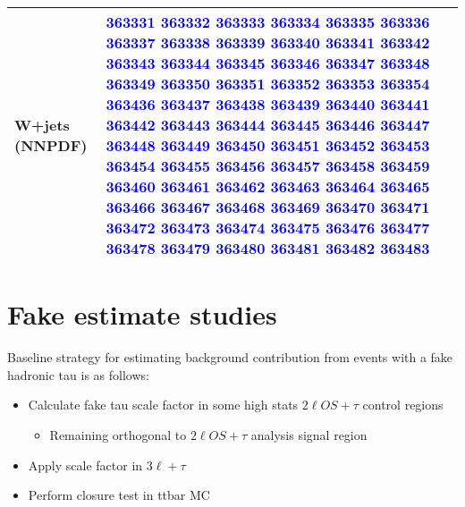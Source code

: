 \documentclass[11pt]{article}
\begin{document}
{\begin{tabular}{|l|p{10cm}|}
			W+jets (NNPDF) & \textcolor{blue}{363331} \textcolor{blue}{363332} \textcolor{blue}{363333} \textcolor{blue}{363334} \textcolor{blue}{363335} \textcolor{blue}{363336} \textcolor{blue}{363337} \textcolor{blue}{363338} \textcolor{blue}{363339} \textcolor{blue}{363340} \textcolor{blue}{363341} \textcolor{blue}{363342} \textcolor{blue}{363343} \textcolor{blue}{363344} \textcolor{blue}{363345} \textcolor{blue}{363346} \textcolor{blue}{363347} \textcolor{blue}{363348} \textcolor{blue}{363349} \textcolor{blue}{363350} \textcolor{blue}{363351} \textcolor{blue}{363352} \textcolor{blue}{363353} \textcolor{blue}{363354} \textcolor{blue}{363436} \textcolor{blue}{363437} \textcolor{blue}{363438} \textcolor{blue}{363439} \textcolor{blue}{363440} \textcolor{blue}{363441} \textcolor{blue}{363442} \textcolor{blue}{363443} \textcolor{blue}{363444} \textcolor{blue}{363445} \textcolor{blue}{363446} \textcolor{blue}{363447} \textcolor{blue}{363448} \textcolor{blue}{363449} \textcolor{blue}{363450} \textcolor{blue}{363451} \textcolor{blue}{363452} \textcolor{blue}{363453} \textcolor{blue}{363454} \textcolor{blue}{363455} \textcolor{blue}{363456} \textcolor{blue}{363457} \textcolor{blue}{363458} \textcolor{blue}{363459} \textcolor{blue}{363460} \textcolor{blue}{363461} \textcolor{blue}{363462} \textcolor{blue}{363463} \textcolor{blue}{363464} \textcolor{blue}{363465} \textcolor{blue}{363466} \textcolor{blue}{363467} \textcolor{blue}{363468} \textcolor{blue}{363469} \textcolor{blue}{363470} \textcolor{blue}{363471} \textcolor{blue}{363472} \textcolor{blue}{363473} \textcolor{blue}{363474} \textcolor{blue}{363475} \textcolor{blue}{363476} \textcolor{blue}{363477} \textcolor{blue}{363478} \textcolor{blue}{363479} \textcolor{blue}{363480} \textcolor{blue}{363481} \textcolor{blue}{363482} \textcolor{blue}{363483} \\
			\hline
			\end{tabular}}

	\clearpage
	\section{Fake estimate studies} 
		Baseline strategy for estimating background contribution from events with a fake hadronic tau is as follows: 
		\begin{itemize}
			\item Calculate fake tau scale factor in some high stats $2\ell OS+\tau$ control regions  
				\begin{itemize}
					\item Remaining orthogonal to $2\ell OS+\tau$ analysis signal region
				\end{itemize} 
			\item Apply scale factor in $3\ell+\tau$
			\item Perform closure test in ttbar MC 
		\end{itemize}
\end{document}
